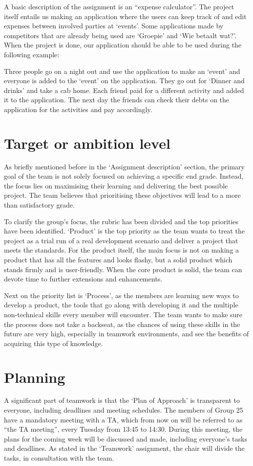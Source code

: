 \documentclass[sigconf,nonacm]{acmart}
\begin{document}
A basic description of the assignment is an “expense calculator”. The project itself entails us making an application where the users can keep track of and edit expenses between involved parties at ‘events’. Some applications made by competitors that are already being used are ‘Groepie’ and ‘Wie betaalt wat?’. When the project is done, our application should be able to be used during the following example:

Three people go on a night out and use the application to make an ‘event’ and everyone is added to the ‘event’ on the application. They go out for ‘Dinner and drinks’ and take a cab home. Each friend paid for a different activity and added it to the application. The next day the friends can check their debts on the application for the activities and pay accordingly.

\section{Target or ambition level}
As briefly mentioned before in the ‘Assignment description’ section, the primary goal of the team is not solely focused on achieving a specific end grade. Instead, the focus lies on maximising their learning and delivering the best possible project. The team believes that prioritising these objectives will lead to a more than satisfactory grade.

To clarify the group’s focus, the rubric has been divided and the top priorities have been identified. ‘Product’ is the top priority as the team wants to treat the project as a trial run of a real development scenario and deliver a project that meets the standards. For the product itself, the main focus is not on making a product that has all the features and looks flashy, but a solid product which stands firmly and is user-friendly.
When the core product is solid, the team can devote time to further extensions and enhancements.

Next on the priority list is ‘Process’, as the members are learning new ways to develop a product, the tools that go along with developing it and the multiple non-technical skills every member will encounter. The team wants to make sure the process does not take a backseat, as the chances of using these skills in the future are very high, especially in teamwork environments, and see the benefits of acquiring this type of knowledge.

\section{Planning}
A significant part of teamwork is that the ‘Plan of Approach’ is transparent to everyone, including deadlines and meeting schedules. The members of Group 25 have a mandatory meeting with a TA, which from now on will be referred to as “the TA meeting”, every Tuesday from 13:45 to 14:30. During this meeting, the plans for the coming week will be discussed and made, including everyone’s tasks and deadlines. As stated in the ‘Teamwork’ assignment, the chair will divide the tasks, in consultation with the team.
\end{document}
